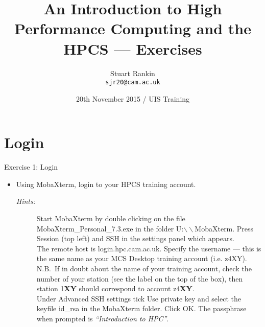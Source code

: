 \documentclass{beamer}
\title[HPC: An introduction --- Exercises] %
{An Introduction to High Performance Computing and the HPCS --- Exercises}
\author[SJ Rankin] %
{Stuart Rankin\\ \texttt{sjr20@cam.ac.uk}}
\institute[HPCS, University of Cambridge] %
{High Performance Computing Service (http://www.hpc.cam.ac.uk/)\\
University Information Services (http://www.uis.cam.ac.uk/)}
\date[20/11/2015] %
{20th November 2015 / UIS Training}
\begin{document}
\begin{frame}
  \titlepage
\end{frame}

\section{Login}
\begin{frame}{Exercise 1: Login}
\begin{itemize}
\item{Using MobaXterm, login to your HPCS training account.}
\begin{description}
\item[\emph{Hints:}]{\small Start MobaXterm by double clicking on the file \alert{MobaXterm\_Personal\_7.3.exe} in the folder U:$\backslash\backslash$MobaXterm. Press \alert{Session} (top left) and \alert{SSH} in the settings panel which appears.\\\smallskip
The remote host is \alert{login.hpc.cam.ac.uk}. Specify the username --- this is the same name as your MCS Desktop training account (i.e. \alert{z4XY}).\hfill\\\smallskip
{\scriptsize N.B.\ If in doubt about the name of your training account, check the number of your station (see the label on the top of the box), then station 1\textbf{XY} should correspond to account z4\textbf {XY}.}\hfill\\\smallskip
Under \alert{Advanced SSH settings} tick \alert{Use private key} and select the keyfile \alert{id\_rsa} in the MobaXterm folder. Click OK. The passphrase when prompted is \alert{\emph{``Introduction to HPC''}}.}
\end{description}
\end{itemize}
\end{frame}
\end{document}
